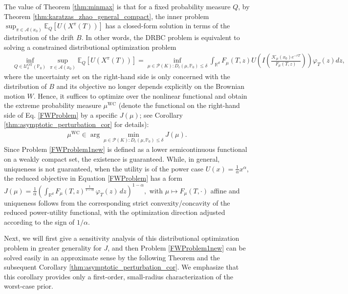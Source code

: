 \documentclass[11pt]{article}
\theoremstyle{definition}
\begin{document}
The value of Theorem \ref{thm:minmax} %
is that for a fixed probability measure ${Q}$, by Theorem \ref{thm:karatzas_zhao_general_compact}, the inner problem $\sup_{\pi \in \mathcal{A}(x_0)}  \mathbb{E}_{{Q}}\left[U(X^\pi(T))\right]$ has a closed-form solution in terms of the distribution of the drift $B$. 
{
In other words, the DRBC problem is equivalent to solving a constrained distributional optimization problem
\begin{align}\label{FWProblem}
&\inf_{{Q} \in \mathcal{U}^{\text{OT}}_{\delta}(\mathbb{P}_0)}\sup_{\pi \in \mathcal{A}(x_0)} 
 \mathbb{E}_{{Q}}\left[U(X^\pi(T))\right]
= \inf_{\mu \in \mathcal{P}(K): D_c(\mu,\mathbb{P}_0) \le \delta}\int_{\mathbb{R}^d} F_{\mu}(T, z) U\left( I\left( \frac{\mathcal{K}_{\mu}(x_0) e^{-rT}}{F_{\mu}(T,z)} \right) \right) \varphi_T(z) dz, 
\end{align}
where 
the uncertainty set on the right-hand side is only concerned with the distribution of $B$ and its objective  no longer depends explicitly on the Brownian motion $W$.} Hence, it suffices to optimize over the nonlinear functional and obtain the extreme probability measure {$\mu^{\text{WC}}$} (denote the functional on the right-hand side of Eq. \eqref{FWProblem} by a specific $J(\mu)$; see Corollary \ref{thm:asymptotic_perturbation_cor} for details):  
\begin{align}\label{FWProblem1new}
\mu^{\text{WC}} {\in} 
\arg\min_{\mu {\in \mathcal{P}(K)}: D_c(\mu,\mathbb{P}_0) \le \delta}{J}(\mu).
\end{align}
{Since Problem \eqref{FWProblem1new} is defined as a lower semicontinuous functional on a weakly compact set, the existence is guaranteed. While, in general, uniqueness is not guaranteed, when the utility is of the power case $U(x) = \frac{1}{\alpha} x^\alpha$, the reduced objective in Equation \eqref{FWProblem} has a form $J(\mu)= \frac{1}{\alpha} (\int_{\mathbb R^d} F_{\mu}(T,z)^{\frac{1}{1-\alpha}}\,\varphi_T(z)\,dz)^{1-\alpha},$ with $\mu \mapsto F_{\mu}(T,\cdot)$ affine
and uniqueness follows from the corresponding strict convexity/concavity of the reduced
power-utility functional, with the optimization direction adjusted according to the sign of
\(1/\alpha\).%
}

Next, we will first give a sensitivity analysis of this distributional optimization problem in greater generality for $J$, and then Problem \eqref{FWProblem1new} can be solved easily in an approximate sense by the following Theorem and the subsequent Corollary \ref{thm:asymptotic_perturbation_cor}. {We emphasize that this corollary provides only a first-order, small-radius characterization of the worst-case prior.} 
\end{document}
